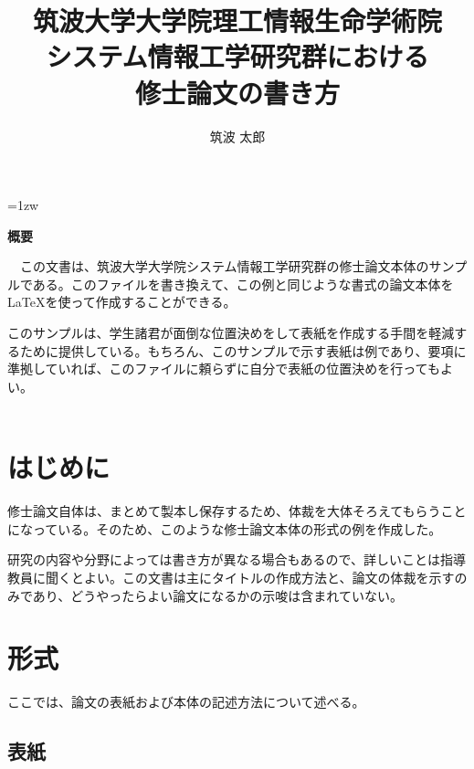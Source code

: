 \documentclass[a4paper,11pt,dvipdfmx]{ujreport}
\title{筑波大学大学院理工情報生命学術院\\システム情報工学研究群における\\修士論文の書き方}
\author{筑波 太郎}
\begin{document}
\maketitle
\thispagestyle{empty}
\newpage

\thispagestyle{empty}
\vspace*{20pt plus 1fil}
\parindent=1zw
\noindent
\begin{center}
{\bf 概要}
\vspace{5mm}
\end{center}
　この文書は、筑波大学大学院システム情報工学研究群の修士論文本体のサンプルである。このファイルを書き換えて、この例と同じような書式の論文本体を \LaTeX を使って作成することができる。

このサンプルは、学生諸君が面倒な位置決めをして表紙を作成する手間を軽減するために提供している。もちろん、このサンプルで示す表紙は例であり、要項に準拠していれば、このファイルに頼らずに自分で表紙の位置決めを行ってもよい。\\
\\
\par
\vspace{0pt plus 1fil}
\newpage

\tableofcontents
\listoffigures

\pagebreak \setcounter{page}{1}


\chapter{はじめに}

修士論文自体は、まとめて製本し保存するため、体裁を大体そろえてもらうことになっている。そのため、このような修士論文本体の形式の例を作成した。

研究の内容や分野によっては書き方が異なる場合もあるので、詳しいことは指導教員に聞くとよい。この文書は主にタイトルの作成方法と、論文の体裁を示すのみであり、どうやったらよい論文になるかの示唆は含まれていない。

\chapter{形式}

ここでは、論文の表紙および本体の記述方法について述べる。

\section{表紙}
\end{document}
